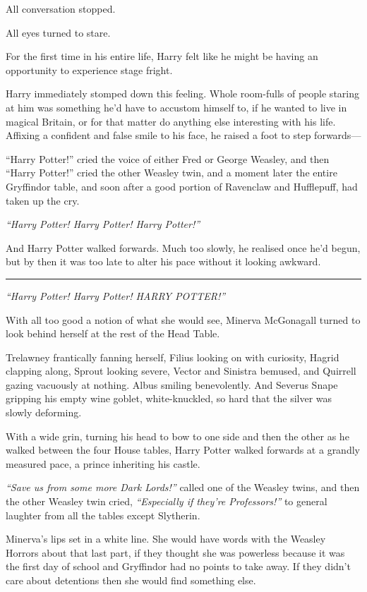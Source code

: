 All conversation stopped.

All eyes turned to stare.

For the first time in his entire life, Harry felt like he might be
having an opportunity to experience stage fright.

Harry immediately stomped down this feeling. Whole room-fulls of people
staring at him was something he'd have to accustom himself to, if he
wanted to live in magical Britain, or for that matter do anything else
interesting with his life. Affixing a confident and false smile to his
face, he raised a foot to step forwards---

``Harry Potter!'' cried the voice of either Fred or George Weasley, and
then ``Harry Potter!'' cried the other Weasley twin, and a moment later
the entire Gryffindor table, and soon after a good portion of Ravenclaw
and Hufflepuff, had taken up the cry.

\emph{``Harry Potter! Harry Potter! Harry Potter!''}

And Harry Potter walked forwards. Much too slowly, he realised once he'd
begun, but by then it was too late to alter his pace without it looking
awkward.

\begin{center}\rule{3in}{0.4pt}\end{center}

\emph{``Harry Potter! Harry Potter! HARRY POTTER!''}

With all too good a notion of what she would see, Minerva McGonagall
turned to look behind herself at the rest of the Head Table.

Trelawney frantically fanning herself, Filius looking on with curiosity,
Hagrid clapping along, Sprout looking severe, Vector and Sinistra
bemused, and Quirrell gazing vacuously at nothing. Albus smiling
benevolently. And Severus Snape gripping his empty wine goblet,
white-knuckled, so hard that the silver was slowly deforming.

With a wide grin, turning his head to bow to one side and then the other
as he walked between the four House tables, Harry Potter walked forwards
at a grandly measured pace, a prince inheriting his castle.

\emph{``Save us from some more Dark Lords!''} called one of the Weasley
twins, and then the other Weasley twin cried, \emph{``Especially if
they're Professors!''} to general laughter from all the tables except
Slytherin.

Minerva's lips set in a white line. She would have words with the
Weasley Horrors about that last part, if they thought she was powerless
because it was the first day of school and Gryffindor had no points to
take away. If they didn't care about detentions then she would find
something else.

